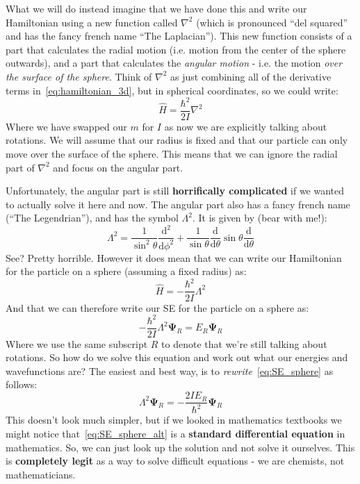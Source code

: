 \documentclass{memoir}[11pt,oneside,a4paper,openany]
\newcommand{\wf}{\ensuremath{\bm{\Psi}}\xspace}
\newcommand{\dd}{\ensuremath{\mathrm{d}}}
\begin{document}
What we will do instead imagine that we have done this and write our Hamiltonian using a new function called $\nabla^2$ (which is pronounced ``del squared'' and has the fancy french name ``The Laplacian''). This new function consists of a part that calculates the radial motion (i.e. motion from the center of the sphere outwards), and a part that calculates the \emph{angular motion} - i.e. the motion \emph{over the surface of the sphere}. Think of $\nabla^2$ as just combining all of the derivative terms in~\autoref{eq:hamiltonian_3d}, but in spherical coordinates, so we could write:
\begin{equation}
	\hat{H} = \frac{\hbar^2}{2I}\nabla^2
\end{equation}
Where we have swapped our $m$ for $I$ as now we are explicitly talking about rotations. We will assume that our radius is fixed and that our particle can only move over the surface of the sphere. This means that we can ignore the radial part of $\nabla^2$ and focus on the angular part.  

Unfortunately, the angular part is still \textbf{horrifically complicated} if we wanted to actually solve it here and now. The angular part also has a fancy french name (``The Legendrian''), and has the symbol $\Lambda^2$. It is given by (bear with me!):
\begin{equation}
	\Lambda^2 = \frac{1}{\sin^2\theta}\frac{\dd^2}{\dd\phi^2} + \frac{1}{\sin\theta}\frac{\dd}{\dd \theta}\sin\theta\frac{\dd}{\dd\theta}
\end{equation}
See? Pretty horrible. However it does mean that we can write our Hamiltonian for the particle on a sphere (assuming a fixed radius) as:
\begin{equation}
	\hat{H} = -\frac{\hbar^2}{2I}\Lambda^2
\end{equation}
And that we can therefore write our SE for the particle on a sphere as:
\begin{equation}\label{eq:SE_sphere}
	-\frac{\hbar^2}{2I}\Lambda^2\wf_R = E_R\wf_R
\end{equation}
Where we use the same subscript $R$ to denote that we're still talking about rotations. So how do we solve this equation and work out what our energies and wavefunctions are? The easiest and best way, is to \emph{rewrite}~\autoref{eq:SE_sphere} as follows:
\begin{equation}\label{eq:SE_sphere_alt}
	\Lambda^2\wf_R = -\frac{2IE_R}{\hbar^2}\wf_R
\end{equation}
This doesn't look much simpler, but if we looked in mathematics textbooks we might notice that~\autoref{eq:SE_sphere_alt} is a \textbf{standard differential equation} in mathematics. So, we can just look up the solution and not solve it ourselves. This is \textbf{completely legit} as a way to solve difficult equations - we are chemists, not mathematicians.
\end{document}

